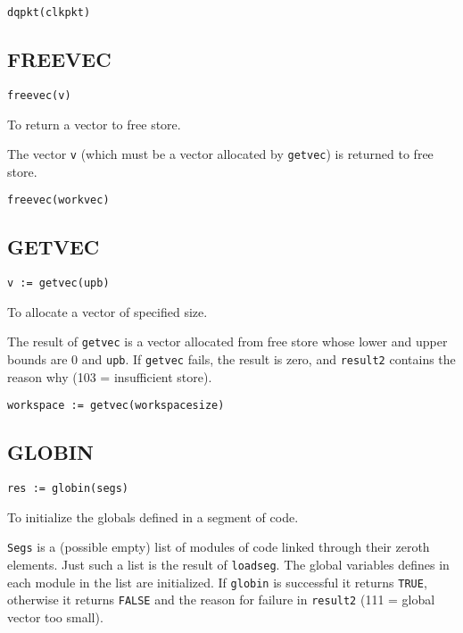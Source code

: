 \verb|dqpkt(clkpkt)|



\subsection{FREEVEC}

\verb|freevec(v)|

  To return a vector to free store.


     The vector \verb|v| (which must be a vector allocated by
\verb|getvec|) is returned to free store.

\verb|freevec(workvec)|

\subsection{GETVEC}

\verb|v := getvec(upb)|

  To allocate a vector of specified size.


     The result of \verb|getvec| is a vector allocated from free store
whose lower and upper bounds are 0 and \verb|upb|.  If \verb|getvec|
fails, the result is zero, and \verb|result2| contains the reason why
(103 = insufficient store).

\verb|workspace := getvec(workspacesize)|


\subsection{GLOBIN}

\verb|res := globin(segs)|

 To initialize the globals defined in a segment of
code.


     \verb|Segs| is a (possible empty) list of modules of code linked
through their zeroth elements.  Just such a list is the result of
\verb|loadseg|.  The global variables defines in each module in the
list are initialized.  If \verb|globin| is successful it returns
\verb|TRUE|, otherwise it returns \verb|FALSE| and the reason for
failure in \verb|result2| (111 = global vector too small).

